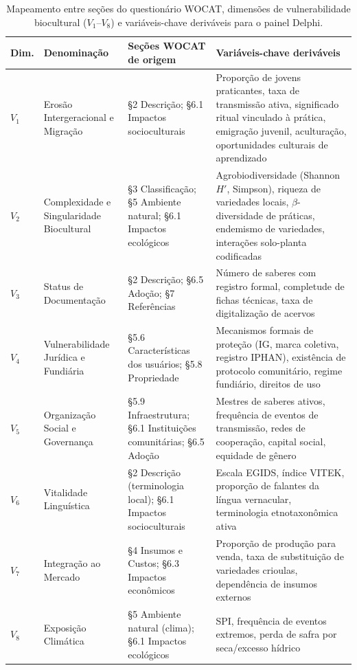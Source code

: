 \begin{table}[htbp]
\centering
\caption{Mapeamento entre seções do questionário WOCAT, dimensões de vulnerabilidade biocultural ($V_1$--$V_8$) e variáveis-chave deriváveis para o painel Delphi.}
\label{tab:wocat_delphi}
\small
\begin{tabular}{p{1cm}p{2.8cm}p{4cm}p{5cm}}
\toprule
\textbf{Dim.} & \textbf{Denominação} & \textbf{Seções WOCAT de origem} & \textbf{Variáveis-chave deriváveis} \\
\midrule
$V_1$ & Erosão Intergeracional e Migração \cite{ReyesGarcia2013evidence,GomezBaggethun2013,TangGavin2016} & §2 Descrição; §6.1 Impactos socioculturais & Proporção de jovens praticantes, taxa de transmissão ativa, significado ritual vinculado à prática, emigração juvenil, aculturação, oportunidades culturais de aprendizado \\
\addlinespace
$V_2$ & Complexidade e Singularidade Biocultural \cite{Maffi2001,Pretty2009,FernandezLlamazares2021,Zimmerer2018} & §3 Classificação; §5 Ambiente natural; §6.1 Impactos ecológicos & Agrobiodiversidade (Shannon $H'$, Simpson), riqueza de variedades locais, $\beta$-diversidade de práticas, endemismo de variedades, interações solo-planta codificadas \\
\addlinespace
$V_3$ & Status de Documentação \cite{Maina2012,Poorna2014,Balogun2021} & §2 Descrição; §6.5 Adoção; §7 Referências & Número de saberes com registro formal, completude de fichas técnicas, taxa de digitalização de acervos \\
\addlinespace
$V_4$ & Vulnerabilidade Jurídica e Fundiária \cite{Dutfield2004,Cottier2004,BavikatteRobinson2011} & §5.6 Características dos usuários; §5.8 Propriedade & Mecanismos formais de proteção (IG, marca coletiva, registro IPHAN), existência de protocolo comunitário, regime fundiário, direitos de uso \\
\addlinespace
$V_5$ & Organização Social e Governança \cite{Berkes2004,OlssonFolkeBerkes2004,Folke2004} & §5.9 Infraestrutura; §6.1 Instituições comunitárias; §6.5 Adoção & Mestres de saberes ativos, frequência de eventos de transmissão, redes de cooperação, capital social, equidade de gênero \\
\addlinespace
$V_6$ & Vitalidade Linguística \cite{Moseley2010,Zent2014} & §2 Descrição (terminologia local); §6.1 Impactos socioculturais & Escala EGIDS, índice VITEK, proporção de falantes da língua vernacular, terminologia etnotaxonômica ativa \\
\addlinespace
$V_7$ & Integração ao Mercado \cite{Bellon2004,Brush2004} & §4 Insumos e Custos; §6.3 Impactos econômicos & Proporção de produção para venda, taxa de substituição de variedades crioulas, dependência de insumos externos \\
\addlinespace
$V_8$ & Exposição Climática \cite{Altieri2015,Dossou2022} & §5 Ambiente natural (clima); §6.1 Impactos ecológicos & SPI, frequência de eventos extremos, perda de safra por seca/excesso hídrico \\
\bottomrule
\end{tabular}
\end{table}

